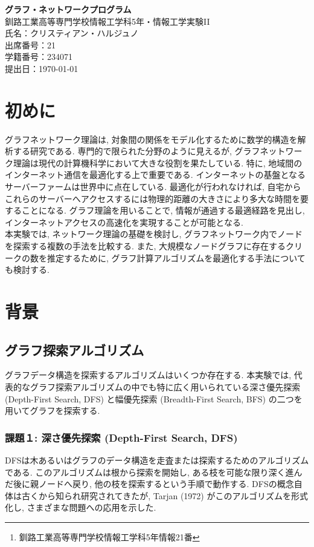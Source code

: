 \documentclass[a4j, 12pt]{jarticle}
\author{クリスティアン　ハルジュノ\thanks{釧路工業高等専門学校情報工学科5年情報21番}}
\date{\today}
\begin{document}
\begin{titlepage}
  \centering
  \vspace*{3cm}

  {\fontsize{25pt}{36pt}\selectfont\bfseries グラフ・ネットワークプログラム} \\[1cm]  %
  {\Large 釧路工業高等専門学校情報工学科5年・情報工学実験II} \\[1cm]
  {\large 氏名：クリスティアン・ハルジュノ} \\[1cm]
  {\large 出席番号：21} \\[1cm]
  {\large 学籍番号：234071} \\[5cm]
  {\Large 提出日：\today} \\
  \vfill
\end{titlepage}
\tableofcontents
\newpage
\setcounter{page}{1}
\section{初めに}
グラフネットワーク理論は, 対象間の関係をモデル化するために数学的構造を解析する研究である. 専門的で限られた分野のように見えるが, グラフネットワーク理論は現代の計算機科学において大きな役割を果たしている. 特に, 地域間のインターネット通信を最適化する上で重要である. インターネットの基盤となるサーバーファームは世界中に点在している. 最適化が行われなければ, 自宅からこれらのサーバーへアクセスするには物理的距離の大きさにより多大な時間を要することになる. グラフ理論を用いることで, 情報が通過する最適経路を見出し, インターネットアクセスの高速化を実現することが可能となる.\\

本実験では, ネットワーク理論の基礎を検討し, グラフネットワーク内でノードを探索する複数の手法を比較する. また, 大規模なノードグラフに存在するクリークの数を推定するために, グラフ計算アルゴリズムを最適化する手法についても検討する.
\section{背景}\label{sec:background}
\subsection{グラフ探索アルゴリズム}\label{sec:graph-traversal}
グラフデータ構造を探索するアルゴリズムはいくつか存在する. 本実験では, 代表的なグラフ探索アルゴリズムの中でも特に広く用いられている深さ優先探索 (Depth-First Search, DFS) と幅優先探索 (Breadth-First Search, BFS) の二つを用いてグラフを探索する.

\subsubsection{課題１: 深さ優先探索 (Depth-First Search, DFS)}\label{sec:dfs}
DFSは木あるいはグラフのデータ構造を走査または探索するためのアルゴリズムである. このアルゴリズムは根から探索を開始し, ある枝を可能な限り深く進んだ後に親ノードへ戻り, 他の枝を探索するという手順で動作する. DFSの概念自体は古くから知られ研究されてきたが, Tarjan (1972) がこのアルゴリズムを形式化し, さまざまな問題への応用を示した\cite{tarjan1972dfs}.\\
\end{document}
